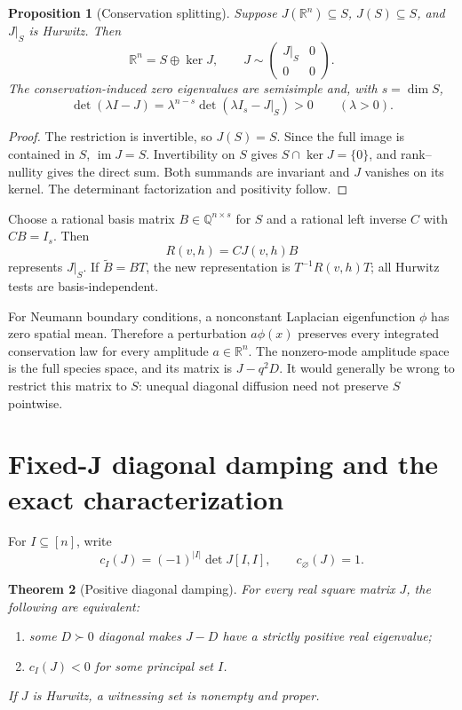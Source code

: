 \documentclass[11pt]{article}
\newtheorem{theorem}{Theorem}[section]
\newtheorem{proposition}[theorem]{Proposition}
\theoremstyle{definition}
\newcommand{\R}{\mathbb R}
\newcommand{\Q}{\mathbb Q}
\newcommand{\im}{\operatorname{im}}
\begin{document}
\begin{proposition}[Conservation splitting]
\label{prop:conservation}
Suppose $J(\R^n)\subseteq S$, $J(S)\subseteq S$, and $J|_S$ is Hurwitz.  Then
\[
 \R^n=S\oplus\ker J,
 \qquad
 J\sim\begin{pmatrix}J|_S&0\\0&0\end{pmatrix}.
\]
The conservation-induced zero eigenvalues are semisimple and, with
$s=\dim S$,
\begin{equation}
 \det(\lambda I-J)=\lambda^{n-s}\det(\lambda I_s-J|_S)>0
 \qquad(\lambda>0).
 \label{eq:positive-axis}
\end{equation}
\end{proposition}

\begin{proof}
The restriction is invertible, so $J(S)=S$.  Since the full image is contained
in $S$, $\im J=S$.  Invertibility on $S$ gives $S\cap\ker J=\{0\}$, and
rank--nullity gives the direct sum.  Both summands are invariant and $J$
vanishes on its kernel.  The determinant factorization and positivity follow.
\end{proof}

Choose a rational basis matrix $B\in\Q^{n\times s}$ for $S$ and a rational
left inverse $C$ with $CB=I_s$.  Then
\begin{equation}
 R(v,h)=CJ(v,h)B
 \label{eq:reduced}
\end{equation}
represents $J|_S$.  If $\widetilde B=BT$, the new representation is
$T^{-1}R(v,h)T$; all Hurwitz tests are basis-independent.

For Neumann boundary conditions, a nonconstant Laplacian eigenfunction
$\phi$ has zero spatial mean.  Therefore a perturbation $a\phi(x)$ preserves
every integrated conservation law for every amplitude $a\in\R^n$.  The
nonzero-mode amplitude space is the full species space, and its matrix is
$J-q^2D$.  It would generally be wrong to restrict this matrix to $S$: unequal
diagonal diffusion need not preserve $S$ pointwise.

\section{Fixed-J diagonal damping and the exact characterization}
\label{sec:characterization}

For $I\subseteq[n]$, write
\[
 c_I(J)=(-1)^{|I|}\det J[I,I],\qquad c_\varnothing(J)=1.
\]

\begin{theorem}[Positive diagonal damping]
\label{thm:fixedJ}
For every real square matrix $J$, the following are equivalent:
\begin{enumerate}[label=(\roman*)]
\item some $D\succ0$ diagonal makes $J-D$ have a strictly positive real
eigenvalue;
\item $c_I(J)<0$ for some principal set $I$.
\end{enumerate}
If $J$ is Hurwitz, a witnessing set is nonempty and proper.
\end{theorem}
\end{document}
